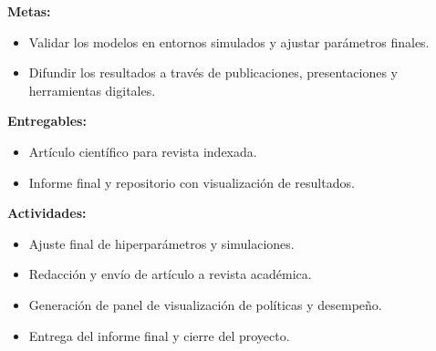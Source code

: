 \documentclass[12pt]{article}
\begin{document}
\textbf{Metas:}
\begin{itemize}
  \item Validar los modelos en entornos simulados y ajustar parámetros finales.
  \item Difundir los resultados a través de publicaciones, presentaciones y herramientas digitales.
\end{itemize}

\textbf{Entregables:}
\begin{itemize}
  \item Artículo científico para revista indexada.
  \item Informe final y repositorio con visualización de resultados.
\end{itemize}

\textbf{Actividades:}
\begin{itemize}
  \item Ajuste final de hiperparámetros y simulaciones.
  \item Redacción y envío de artículo a revista académica.
  \item Generación de panel de visualización de políticas y desempeño.
  \item Entrega del informe final y cierre del proyecto.
\end{itemize}
\end{document}
